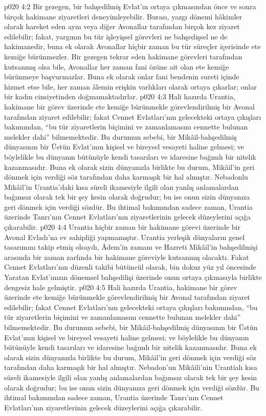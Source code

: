 \vs p020 4:2 Bir gezegen, bir bahşedilmiş Evlat’ın ortaya çıkmasından önce ve sonra birçok hakimane ziyaretleri deneyimleyebilir. Burası, yazgı dönemi hâkimler olarak hareket eden aynı veya diğer Avonallar tarafından birçok kez ziyaret edilebilir; fakat, yargının bu tür işleyişsel görevleri ne bahşedişsel ne de hakimanedir, buna ek olarak Avonallar hiçbir zaman bu tür süreçler içerisinde ete kemiğe bürünmezler. Bir gezegen tekrar eden hakimane görevleri tarafından kutsanmış olsa bile, Avonallar her zaman fani özüne ait olan ete kemiğe bürünmeye başvurmazlar. Buna ek olarak onlar fani bendenin sureti içinde hizmet etse bile, her zaman âlemin erişkin varlıkları olarak ortaya çıkarlar; onlar bir kadın cinsiyetinden doğmamaktadırlar.
\vs p020 4:3 Hali hazırda Urantia, hakimane bir görev üzerinde ete kemiğe bürünmekle görevlendirilmiş bir Avonal tarafından ziyaret edilebilir; fakat Cennet Evlatları’nın gelecekteki ortaya çıkışları bakımından, “bu tür ziyaretlerin biçimini ve zamanlamasını cennette bulunan melekler dahi” bilmemektedir. Bu durumun sebebi, bir Mikâil\hyp{}bahşedilmiş dünyasının bir Üstün Evlat’ının kişisel ve bireysel vesayeti haline gelmesi; ve böylelikle bu dünyanın bütünüyle kendi tasarıları ve idaresine bağımlı bir nitelik kazanmasıdır. Buna ek olarak sizin dünyanızla birlikte bu durum, Mikâil’in geri dönmek için verdiği söz tarafından daha karmaşık bir hal almıştır. Nebadonlu Mikâil’in Urantia’daki kısa süreli ikamesiyle ilgili olan yanlış anlamalardan bağımsız olarak tek bir şey kesin olarak doğrudur; bu ise onun sizin dünyanıza geri dönmek için verdiği sözdür. Bu ihtimal bakımından sadece zaman, Urantia üzerinde Tanrı’nın Cennet Evlatları’nın ziyaretlerinin gelecek düzeylerini açığa çıkarabilir.
\vs p020 4:4 Urantia hiçbir zaman bir hakimane görevi üzerinde bir Avonal Evladı’na ev sahipliği yapmamıştır. Urantia yerleşik dünyaların genel tasarımını takip etmiş olsaydı, Âdem’in zamanı ve Hazreti Mikâil’in bahşedilmişi arasında bir zaman zarfında bir hakimane göreviyle kutsanmış olacaktı. Fakat Cennet Evlatları’nın düzenli takibi bütüncül olarak, bin dokuz yüz yıl öncesinde Yaratan Evlat’ınızın dönemsel bahşedilişi üzerinde onun ortaya çıkmasıyla birlikte dengesiz hale gelmiştir.
\vs p020 4:5 Hali hazırda Urantia, hakimane bir görev üzerinde ete kemiğe bürünmekle görevlendirilmiş bir Avonal tarafından ziyaret edilebilir; fakat Cennet Evlatları’nın gelecekteki ortaya çıkışları bakımından, “bu tür ziyaretlerin biçimini ve zamanlamasını cennette bulunan melekler dahi” bilmemektedir. Bu durumun sebebi, bir Mikâil\hyp{}bahşedilmiş dünyasının bir Üstün Evlat’ının kişisel ve bireysel vesayeti haline gelmesi; ve böylelikle bu dünyanın bütünüyle kendi tasarıları ve idaresine bağımlı bir nitelik kazanmasıdır. Buna ek olarak sizin dünyanızla birlikte bu durum, Mikâil’in geri dönmek için verdiği söz tarafından daha karmaşık bir hal almıştır. Nebadon’un Mikâili’nin Urantialı kısa süreli ikamesiyle ilgili olan yanlış anlamalardan bağımsız olarak tek bir şey kesin olarak doğrudur; bu ise onun sizin dünyanıza geri dönmek için verdiği sözdür. Bu ihtimal bakımından sadece zaman, Urantia üzerinde Tanrı’nın Cennet Evlatları’nın ziyaretlerinin gelecek düzeylerini açığa çıkarabilir.
